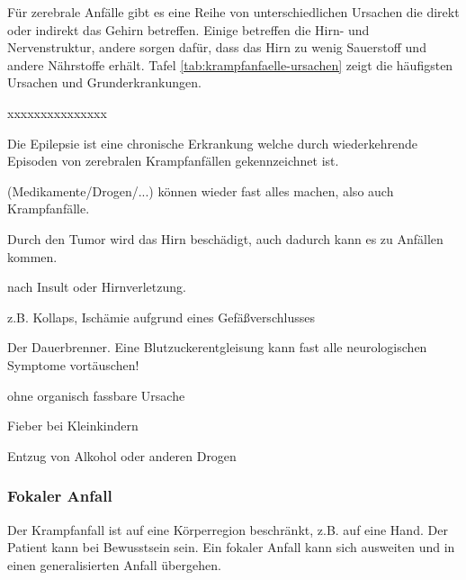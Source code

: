 {
Für zerebrale Anfälle gibt es eine Reihe von unterschiedlichen Ursachen die
direkt oder indirekt das Gehirn betreffen. Einige betreffen die Hirn- und
Nervenstruktur, andere sorgen dafür, dass das Hirn zu wenig
Sauerstoff und andere Nährstoffe erhält. Tafel
\ref{tab:krampfanfaelle-ursachen} zeigt die häufigsten Ursachen und
Grunderkrankungen. 

\begin{labeling}{xxxxxxxxxxxxxxx}
  \item[Epilepsie] Die Epilepsie ist eine chronische Erkrankung welche durch wiederkehrende
  Episoden von zerebralen Krampfanfällen gekennzeichnet ist.
  \item[Vergiftungen] (Medikamente/Drogen/...) können wieder fast alles machen,
  also auch Krampfanfälle. \cite{Supady2009}
  \item[Hirntumor] Durch den Tumor wird das Hirn beschädigt, auch dadurch kann es
  zu Anfällen kommen.
  \item[Narbengewebe] nach Insult oder Hirnverletzung.
  \item[Hirnblutung]
  \item[Sauerstoffmangel] z.B. Kollaps, Ischämie aufgrund eines Gefäßverschlusses
  \item[BZ] Der Dauerbrenner. Eine Blutzuckerentgleisung kann fast alle
  neurologischen Symptome vortäuschen!
  \item[angeboren] ohne organisch fassbare  Ursache
  \item[Fieberkrampf] Fieber bei Kleinkindern
  \item[Infektionen]
  \item[Entzug] Entzug von Alkohol oder anderen Drogen
\end{labeling}
}{
}{}{}{}






\subsubsection{Fokaler Anfall}
\label{topic:krampfanfall-fokaler}
Der Krampfanfall ist auf eine Körperregion beschränkt, z.B.
auf eine Hand. Der Patient kann bei Bewusstsein sein. Ein
fokaler Anfall kann sich ausweiten und in einen
generalisierten Anfall übergehen. 

      


